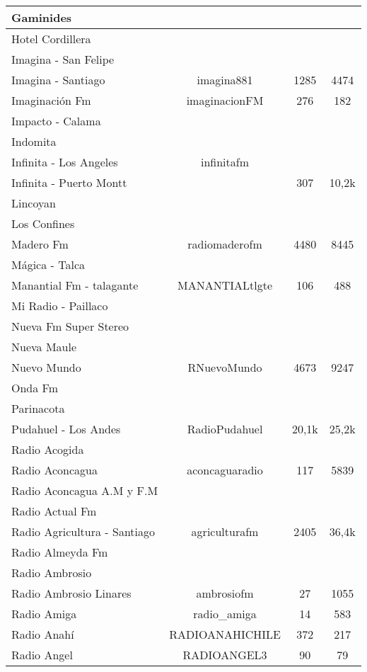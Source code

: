 \begin{center}
\begin{longtable}{| l | c | c | c |}
Gaminides	&		&		&		\\ \hline
Hotel Cordillera	&		&		&		\\ \hline
Imagina - San Felipe	&		&		&		\\ \hline
Imagina - Santiago	&	imagina881	&	1285	&	4474	\\ \hline
Imaginación Fm	&	imaginacionFM	&	276	&	182	\\ \hline
Impacto - Calama	&		&		&		\\ \hline
Indomita	&		&		&		\\ \hline
Infinita - Los Angeles	&	infinitafm	&		&		\\ \hline
Infinita - Puerto Montt	&		&	307	&	10,2k	\\ \hline
Lincoyan	&		&		&		\\ \hline
Los Confines	&		&		&		\\ \hline
Madero Fm	&	radiomaderofm	&	4480	&	8445	\\ \hline
Mágica - Talca	&		&		&		\\ \hline
Manantial Fm - talagante	&	MANANTIALtlgte	&	106	&	488	\\ \hline
Mi Radio - Paillaco	&		&		&		\\ \hline
Nueva Fm Super Stereo	&		&		&		\\ \hline
Nueva Maule	&		&		&		\\ \hline
Nuevo Mundo	&	RNuevoMundo	&	4673	&	9247	\\ \hline
Onda Fm	&		&		&		\\ \hline
Parinacota	&		&		&		\\ \hline
Pudahuel - Los Andes	&	RadioPudahuel	&	20,1k	&	25,2k	\\ \hline
Radio Acogida	&		&		&		\\ \hline
Radio Aconcagua	&	aconcaguaradio	&	117	&	5839	\\ \hline
Radio Aconcagua A.M y F.M	&		&		&		\\ \hline
Radio Actual Fm	&		&		&		\\ \hline
Radio Agricultura - Santiago	&	agriculturafm	&	2405	&	36,4k	\\ \hline
Radio Almeyda Fm	&		&		&		\\ \hline
Radio Ambrosio	&		&		&		\\ \hline
Radio Ambrosio Linares	&	ambrosiofm	&	27	&	1055	\\ \hline
Radio Amiga	&	radio\_amiga	&	14	&	583	\\ \hline
Radio Anahí	&	RADIOANAHICHILE	&	372	&	217	\\ \hline
Radio Angel	&	RADIOANGEL3	&	90	&	79	\\ \hline

\end{longtable}
\end{center}
